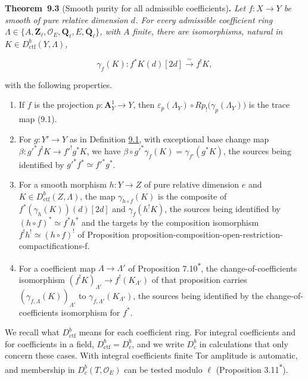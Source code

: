 \documentclass[11pt]{article}
\newenvironment{bpstatement}[2]{\par\addvspace{0.6\baselineskip}\noindent\textbf{#1}#2\textbf{.}\enspace\ignorespaces}
  {\par\addvspace{0.4\baselineskip}}
\newenvironment{bpstatementit}[2]{\begin{bpstatement}{#1}{#2}\itshape\ignorespaces}{\end{bpstatement}}
\newcommand{\bpout}[1]{#1\textsuperscript{\hyperlink{bp-outside}{\ensuremath{\ast}}}}
\providecommand{\Dbc}{}\renewcommand{\Dbc}{D^b_c}
\begin{document}
\label{bp9}%
\begin{bpstatementit}{Theorem~9.3}{ (Smooth purity for all admissible coefficients)}
Let \(f:X\to Y\) be smooth of pure relative dimension \(d\). For every admissible coefficient ring \(\Lambda\in\{A,\mathbf Z_\ell,\mathcal O_E,\mathbf Q_\ell,E,\overline{\mathbf Q}_\ell\}\), with \(A\) finite, there are isomorphisms, natural in \(K\in D^b_{\mathrm{ctf}}(Y,\Lambda)\),

\[
\gamma_f(K):
f^{*}K(d)[2d]\xrightarrow{\sim}f^{!}K,
\tag{9.2}
\]

with the following properties.

\begin{enumerate}
\item If \(f\) is the projection \(p:\mathbf A^1_Y\to Y\), then \(\varepsilon_p(\Lambda_Y)\circ Rp_!\bigl(\gamma_p(\Lambda_Y)\bigr)\) is the trace map (9.1).
\item For \(g:Y'\to Y\) as in Definition \hyperref[bp5]{9.1}, with exceptional base change map \(\beta:g'^*f^!K\to f'^!g^*K\), we have \(\beta\circ g'^*\gamma_f(K)=\gamma_{f'}(g^*K)\), the sources being identified by \(g'^*f^*\simeq f'^*g^*\).
\item For a smooth morphism \(h:Y\to Z\) of pure relative dimension \(e\) and \(K\in D^b_{\mathrm{ctf}}(Z,\Lambda)\), the map \(\gamma_{h\circ f}(K)\) is the composite of \(f^*(\gamma_h(K))(d)[2d]\) and \(\gamma_f(h^!K)\), the sources being identified by \((h\circ f)^*\simeq f^*h^*\) and the targets by the composition isomorphism \(f^!h^!\simeq(h\circ f)^!\) of Proposition proposition-composition-open-restriction-compactifications-f.
\item For a coefficient map \(\Lambda\to\Lambda'\) of Proposition \bpout{7.10}, the change-of-coefficients isomorphism \((f^!K)_{\Lambda'}\to f^!(K_{\Lambda'})\) of that proposition carries \((\gamma_{f,\Lambda}(K))_{\Lambda'}\) to \(\gamma_{f,\Lambda'}(K_{\Lambda'})\), the sources being identified by the change-of-coefficients isomorphism for \(f^*\).
\end{enumerate}
\end{bpstatementit}

\label{bp10}%
We recall what \(D^b_{\mathrm{ctf}}\) means for each coefficient ring. For integral coefficients and for coefficients in a field, \(D^b_{\mathrm{ctf}}=\Dbc\), and we write \(\Dbc\) in calculations that only concern these cases. With integral coefficients finite Tor amplitude is automatic, and membership in \(\Dbc(T,\mathcal O_E)\) can be tested modulo \(\ell\) (Proposition \bpout{3.11}).
\end{document}

